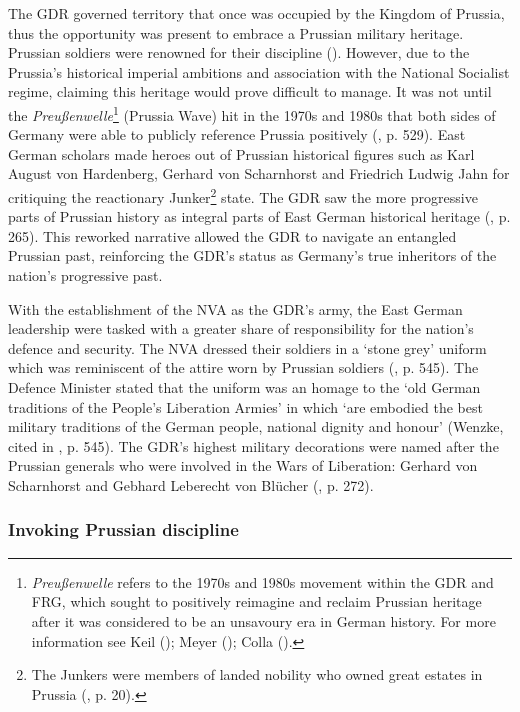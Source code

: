 The GDR governed territory that once was occupied by the Kingdom of Prussia, thus the opportunity was present to embrace a Prussian military heritage. Prussian soldiers were renowned for their discipline (\cite{jackman2004}). However, due to the Prussia’s historical imperial ambitions and association with the National Socialist regime, claiming this heritage would prove difficult to manage. It was not until the \textit{Preußenwelle}\footnote{\textit{Preußenwelle} refers to the 1970s and 1980s movement within the GDR and FRG, which sought to positively reimagine and reclaim Prussian heritage after it was considered to be an unsavoury era in German history. For more information see Keil (\citeyear{keil2016}); Meyer (\citeyear{meyer2018}); Colla (\citeyear{colla2019}).} (Prussia Wave) hit in the 1970s and 1980s that both sides of Germany were able to publicly reference Prussia positively (\cite{colla2019}, p. 529). East German scholars made heroes out of Prussian historical figures such as Karl August von Hardenberg, Gerhard von Scharnhorst and Friedrich Ludwig Jahn for critiquing the reactionary Junker\footnote{The Junkers were members of landed nobility who owned great estates in Prussia (\cite{taylor2001}, p. 20).} state. The GDR saw the more progressive parts of Prussian history as integral parts of East German historical heritage (\cite{keil2016}, p. 265). This reworked narrative allowed the GDR to navigate an entangled Prussian past, reinforcing the GDR’s status as Germany’s true inheritors of the nation’s progressive past.

With the establishment of the NVA as the GDR’s army, the East German leadership were tasked with a greater share of responsibility for the nation’s defence and security. The NVA dressed their soldiers in a ‘stone grey’ uniform which was reminiscent of the attire worn by Prussian soldiers (\cite{colla2019}, p. 545). The Defence Minister stated that the uniform was an homage to the ‘old German traditions of the People’s Liberation Armies’ in which ‘are embodied the best military traditions of the German people, national dignity and honour’ (Wenzke, cited in \cite{colla2019}, p. 545). The GDR’s highest military decorations were named after the Prussian generals who were involved in the Wars of Liberation: Gerhard von Scharnhorst and Gebhard Leberecht von Blücher (\cite{keil2016}, p. 272).

\subsubsection*{Invoking Prussian discipline}

